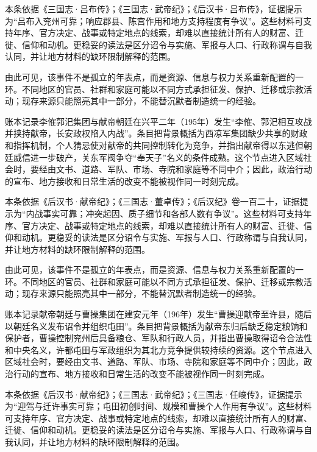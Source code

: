 本条依据《三国志·吕布传》；《三国志·武帝纪》；《后汉书·吕布传》，证据提示为“吕布入兖州可靠；响应郡县、陈宫作用和地方支持程度有争议”。这些材料可支持年序、官方决定、战事或特定地点的线索，却难以直接统计所有人的财富、迁徙、信仰和动机。更稳妥的读法是区分诏令与实施、军报与人口、行政称谓与自我认同，并让地方材料的缺环限制解释的范围。

由此可见，该事件不是孤立的年表点，而是资源、信息与权力关系重新配置的一环。不同地区的官员、社群和家庭可能以不同方式承担征发、保护、迁移或宗教活动；现存来源只能照亮其中一部分，不能替沉默者制造统一的经验。

账本记录李傕郭汜集团与献帝朝廷在兴平二年（195年）发生“李傕、郭汜相互攻战并挟持献帝，长安政权陷入内战”。条目把背景概括为西凉军集团缺少共享的财政和指挥机制，个人猜忌使对献帝的共同控制转化为竞争，并指出献帝得以东逃但朝廷威信进一步破产，关东军阀争夺“奉天子”名义的条件成熟。这个节点进入区域社会时，要经由文书、道路、军队、市场、寺院和家庭等不同中介；因此，政治行动的宣布、地方接收和日常生活的改变不能被视作同一时刻完成。

本条依据《后汉书·献帝纪》；《三国志·董卓传》；《后汉纪》卷一百二十，证据提示为“内战事实可靠；冲突起因、质子细节和各部人数有争议”。这些材料可支持年序、官方决定、战事或特定地点的线索，却难以直接统计所有人的财富、迁徙、信仰和动机。更稳妥的读法是区分诏令与实施、军报与人口、行政称谓与自我认同，并让地方材料的缺环限制解释的范围。

由此可见，该事件不是孤立的年表点，而是资源、信息与权力关系重新配置的一环。不同地区的官员、社群和家庭可能以不同方式承担征发、保护、迁移或宗教活动；现存来源只能照亮其中一部分，不能替沉默者制造统一的经验。

账本记录献帝朝廷与曹操集团在建安元年（196年）发生“曹操迎献帝至许县，随后以朝廷名义发布诏令并组织屯田”。条目把背景概括为献帝东归后缺乏稳定粮饷和保护者，曹操控制兖州后具备粮仓、军队和行政人员，并指出曹操取得诏令合法性和中央名义，许都屯田与军政组织为其北方竞争提供较持续的资源。这个节点进入区域社会时，要经由文书、道路、军队、市场、寺院和家庭等不同中介；因此，政治行动的宣布、地方接收和日常生活的改变不能被视作同一时刻完成。

本条依据《后汉书·献帝纪》；《三国志·武帝纪》；《三国志·任峻传》，证据提示为“迎驾与迁许事实可靠；屯田初创时间、规模和曹操个人作用有争议”。这些材料可支持年序、官方决定、战事或特定地点的线索，却难以直接统计所有人的财富、迁徙、信仰和动机。更稳妥的读法是区分诏令与实施、军报与人口、行政称谓与自我认同，并让地方材料的缺环限制解释的范围。

